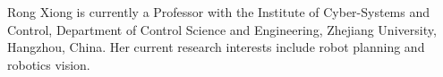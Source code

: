 \documentclass[journal]{IEEEtran}
\begin{document}
\begin{IEEEbiographynophoto}[]{Rong Xiong}
is currently a Professor with the Institute of Cyber-Systems and Control, Department of Control Science and Engineering, Zhejiang University, Hangzhou, China. Her current research interests include robot planning and robotics vision.
\end{IEEEbiographynophoto}




\end{document}
